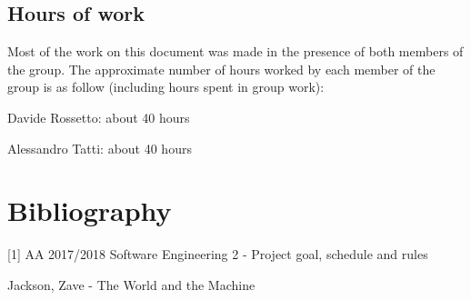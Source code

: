 \documentclass{article}
\begin{document}
	\subsection{Hours of work}
	Most of the work on this document was made in the presence of both members of the group. The approximate number of hours worked by each member of the group is as follow (including hours spent in group work):

	\bigskip
	Davide Rossetto: about 40 hours
	
	Alessandro Tatti: about 40 hours


	\section{Bibliography}

	[1] AA 2017/2018 Software Engineering 2 - Project goal, schedule and rules
	
	\noindent
	\bigskip
	[2] Jackson, Zave - The World and the Machine
\end{document}
